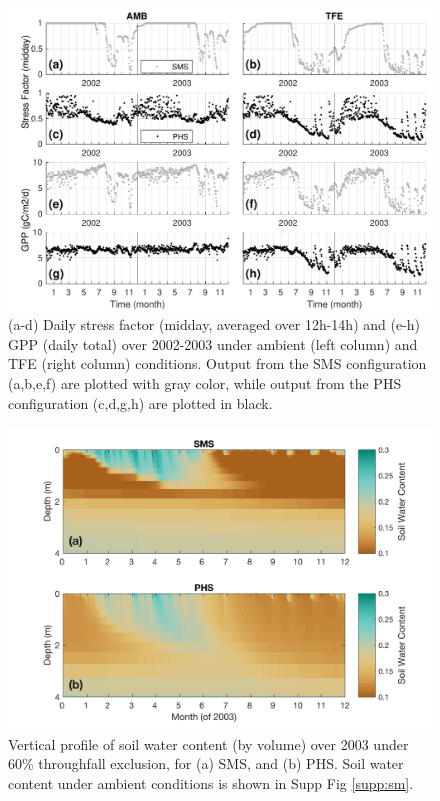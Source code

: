 \documentclass[draft,linenumbers]{agujournal}
\begin{document}
          \clearpage   
  \begin{figure}[h]
     \centering
     \includegraphics[width=30pc]{../figs3/gpp.pdf}
     \caption{(a-d) Daily stress factor (midday, averaged over 12h-14h) and (e-h) GPP (daily total) over 2002-2003 under ambient (left column) and TFE (right column) conditions.
     Output from the SMS configuration (a,b,e,f) are plotted with gray color, while output from the PHS configuration (c,d,g,h) are plotted in black.
     }
     \label{fig:gpp}
  \end{figure} 



      \clearpage
    \begin{figure}[h]
     \centering
     \includegraphics[width=30pc]{../figs3/smp.jpg}
     \caption{Vertical profile of soil water content (by volume) over 2003 under 60\% throughfall exclusion, for
     (a) SMS, and 
     (b) PHS.
     Soil water content under ambient conditions is shown in Supp Fig \ref{supp:sm}.
 }
     \label{fig:sm}
  \end{figure}
\end{document}

